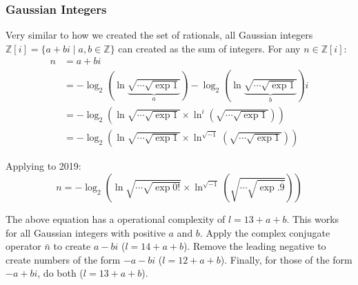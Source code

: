 \subsubsection{Gaussian Integers}
Very similar to how we created the set of rationals, all Gaussian integers $\mathbb{Z}[i]=\{a+bi\mid a,b\in\mathbb{Z}\}$ can created as the sum of integers. For any $n\in\mathbb{Z}[i]$:
\begin{align*}
  n &= a + bi \\
  &= -\log_2\left(
      \ln \underbrace{\sqrt{\cdots\sqrt{\exp1}}}_{a} 
    \right) -
    \log_2\left(
      \ln \underbrace{\sqrt{\cdots\sqrt{\exp1}}}_{b} 
    \right)i \\
  &= -\log_2\left(
      \ln \sqrt{\cdots\sqrt{\exp1}}
      \times
      \ln^i \left(\sqrt{\cdots\sqrt{\exp1}}\right)
    \right) \\
  &= -\log_2\left(
      \ln \sqrt{\cdots\sqrt{\exp1}}
      \times
      \ln^{\sqrt{-1}} \left(\sqrt{\cdots\sqrt{\exp1}}\right)
    \right)
\end{align*}

Applying to 2019:
\begin{equation}
  n = -\log_2\left(
    \ln \sqrt{\cdots\sqrt{\exp0!}}
    \times
    \ln^{\sqrt{-1}} \left(
      \sqrt{\cdots\sqrt{\exp .\overline{9}}}
    \right)
  \right)
\end{equation}

The above equation has a operational complexity of $l=13+a+b$.
This works for all Gaussian integers with positive $a$ and $b$.
Apply the complex conjugate operator $\bar{n}$ to create $a-bi$ ($l=14+a+b$).
Remove the leading negative to create numbers of the form $-a-bi$ ($l=12+a+b$).
Finally, for those of the form $-a+bi$, do both ($l=13+a+b$).

